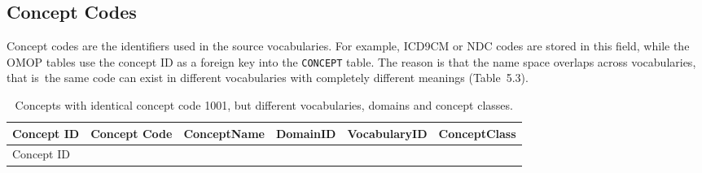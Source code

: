 \documentclass[
  letterpaper,
  paper=7in:10in,
  pagesize=pdftex,
  headinclude=on,
  footinclude=on,
  12pt]{scrbook}
\begin{document}
\subsection{Concept Codes}\label{concept-codes}

Concept codes are the identifiers used in the source vocabularies. For
example, ICD9CM or NDC codes are stored in this field, while the OMOP
tables use the concept ID as a foreign key into the \texttt{CONCEPT}
table. The reason is that the name space overlaps across vocabularies,
that is~the same code can exist in different vocabularies with
completely different meanings (Table~5.3).

\begin{landscape}

\begin{longtable}[]{@{}
  >{\raggedleft\arraybackslash}p{}
  >{\raggedleft\arraybackslash}p{}
  >{\raggedright\arraybackslash}p{}
  >{\raggedright\arraybackslash}p{}
  >{\raggedright\arraybackslash}p{}
  >{\raggedright\arraybackslash}p{}@{}}
\caption{Concepts with identical concept code 1001, but different
vocabularies, domains and concept
classes.}\label{tbl-part-chapter-shorttableterm}\tabularnewline
\toprule\noalign{}
\begin{minipage}[b]{\linewidth}\raggedleft
Concept ID
\end{minipage} & \begin{minipage}[b]{\linewidth}\raggedleft
Concept Code
\end{minipage} & \begin{minipage}[b]{\linewidth}\raggedright
ConceptName
\end{minipage} & \begin{minipage}[b]{\linewidth}\raggedright
DomainID
\end{minipage} & \begin{minipage}[b]{\linewidth}\raggedright
VocabularyID
\end{minipage} & \begin{minipage}[b]{\linewidth}\raggedright
ConceptClass
\end{minipage} \\
\midrule\noalign{}
\endfirsthead
\toprule\noalign{}
\begin{minipage}[b]{\linewidth}\raggedleft
Concept ID

\end{minipage}
\end{longtable}
\end{landscape}
\end{document}
